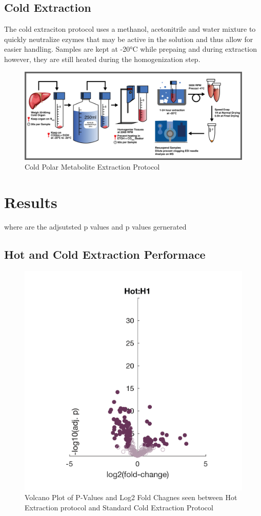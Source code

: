 \documentclass[a4paper]{article}
\begin{document}
\subsection{Cold Extraction}

The cold extraciton protocol uses a methanol, acetonitrile and water mixture to quickly neutralize ezymes that may be active in the solution and thus allow for easier handling. Samples are kept at -20°C while prepaing and during extraction however, they are still heated during the homogenization step. 

\begin{figure}[h]
	\centering
	\includegraphics[width=\linewidth]{Metab-Cold-Proto-MH-20170120}
	\caption{Cold Polar Metabolite Extraction Protocol}
	\label{fig:metab-cold-proto-mh-20170105}
\end{figure}


\section{Results}


where are the adjsutsted p values and p values gernerated 


\subsection{Hot and Cold Extraction Performace}
\begin{figure}[H]
	\centering
	\includegraphics[width=0.5\linewidth]{Hot_H1_01}
	\caption{Volcano Plot of P-Values and Log2 Fold Chagnes seen between Hot Extraction protocol and Standard Cold Extraction Protocol}
	\label{fig:hoth101}
\end{figure}
\end{document}

